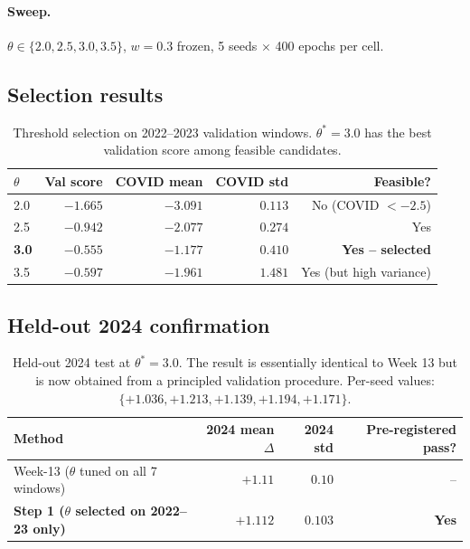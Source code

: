 \paragraph{Sweep.} $\theta \in \{2.0, 2.5, 3.0, 3.5\}$,
$w = 0.3$ frozen, 5 seeds $\times$ 400 epochs per cell.

\subsection{Selection results}

\begin{table}[h!]
\centering
\small
\begin{tabular}{lrrrr}
\toprule
$\theta$ & Val score & COVID mean & COVID std & Feasible? \\
\midrule
2.0 & $-1.665$ & $-3.091$ & $0.113$ & No (COVID $< -2.5$) \\
2.5 & $-0.942$ & $-2.077$ & $0.274$ & Yes \\
\textbf{3.0} & $\mathbf{-0.555}$ & $\mathbf{-1.177}$ & $\mathbf{0.410}$ & \textbf{Yes -- selected} \\
3.5 & $-0.597$ & $-1.961$ & $1.481$ & Yes (but high variance) \\
\bottomrule
\end{tabular}
\caption{Threshold selection on 2022--2023 validation windows.
$\theta^* = 3.0$ has the best validation score among feasible candidates.}
\label{tab:step1-selection}
\end{table}

\subsection{Held-out 2024 confirmation}

\begin{table}[h!]
\centering
\small
\begin{tabular}{lrrr}
\toprule
Method & 2024 mean $\Delta$ & 2024 std & Pre-registered pass? \\
\midrule
Week-13 ($\theta$ tuned on all 7 windows) & $+1.11$ & $0.10$ & -- \\
\textbf{Step 1 ($\theta$ selected on 2022--23 only)} &
  $\mathbf{+1.112}$ & $\mathbf{0.103}$ & \textbf{Yes} \\
\bottomrule
\end{tabular}
\caption{Held-out 2024 test at $\theta^* = 3.0$.
The result is essentially identical to Week 13 but is now obtained
from a principled validation procedure. Per-seed values:
$\{+1.036, +1.213, +1.139, +1.194, +1.171\}$.}
\label{tab:step1-2024}
\end{table}

